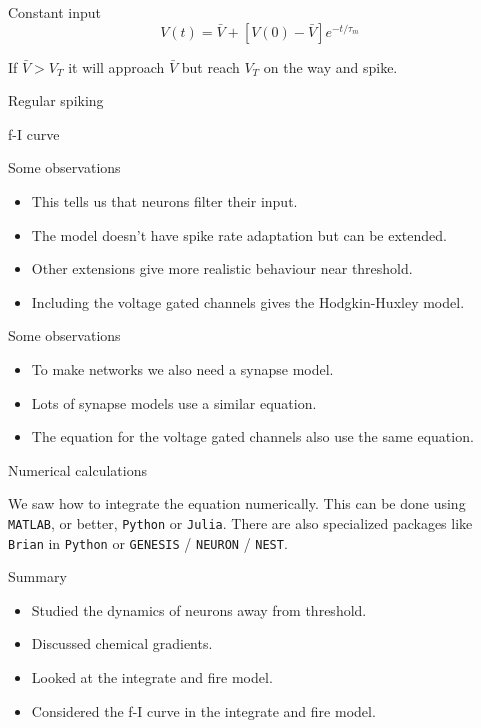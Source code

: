 \documentclass{beamer}
\newcommand{\crish}{\color{reddish}}
\newcommand{\cbla}{\color{black}}
\newcommand{\cblu}{\color{blue}}
\begin{document}
\begin{frame}{Constant input}
\crish{}
  $$V(t)=\bar{V}+[V(0)-\bar{V}]e^{-t/\tau_m}$$
\cbla{}

If \crish{}$\bar{V}>V_T$\cbla{} it will approach \crish{}$\bar{V}$\cbla{} but reach \crish{}$V_T$\cbla{} on the way and spike.
  
\end{frame}


\begin{frame}{Regular spiking}
  \begin{center}
    
\end{center}
  \end{frame}

\begin{frame}{f-I curve}
  \begin{center}
    
\end{center}
  \end{frame}

\begin{frame}{Some observations}
  \begin{itemize}
  \item This tells us that neurons filter their input.
  \item The model doesn't have spike rate adaptation but can be extended.
  \item Other extensions give more realistic behaviour near threshold.
  \item Including the voltage gated channels gives the \cblu{}Hodgkin-Huxley\cbla{} model.
  \end{itemize}
\end{frame}


\begin{frame}{Some observations}
  \begin{itemize}
  \item To make networks we also need a synapse model.
  \item Lots of synapse models use a similar equation.
  \item The equation for the voltage gated channels also use the same equation.
  \end{itemize}
\end{frame}


\begin{frame}{Numerical calculations}

We saw how to integrate the equation numerically. This can be done
using \texttt{MATLAB}, or better, \texttt{Python} or \texttt{Julia}. There are also specialized
packages like \texttt{Brian} in \texttt{Python} or \texttt{GENESIS} / \texttt{NEURON} / \texttt{NEST}.
  
\end{frame}



\begin{frame}{Summary}
  \begin{itemize}
  \item Studied the dynamics of neurons away from threshold.
  \item Discussed chemical gradients.
  \item Looked at the integrate and fire model.
  \item Considered the f-I curve in the integrate and fire model.
  \end{itemize}
\end{frame}
\end{document}
